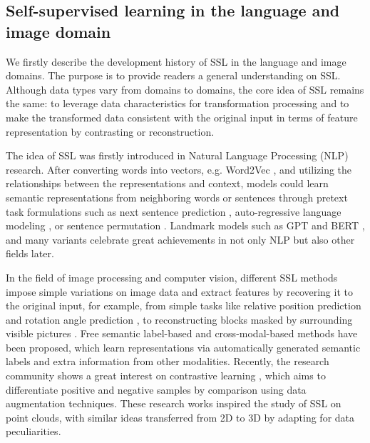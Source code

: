 \documentclass[a4paper,fleqn]{cas-dc}
\begin{document}
\subsection{Self-supervised learning in the language and image domain}
We firstly describe the development history of SSL in the language and image domains. The purpose is to provide readers a general understanding on SSL. Although data types vary from domains to domains, the core idea of SSL remains the same: to leverage data characteristics for transformation processing and to make the transformed data consistent with the original input in terms of feature representation by contrasting or reconstruction.

The idea of SSL was firstly introduced in Natural Language Processing (NLP) research. After converting words into vectors, e.g. Word2Vec \citep{mikolov2013efficient}, and utilizing the relationships between the representations and context, models could learn semantic representations from neighboring words or sentences through pretext task formulations such as next sentence prediction \citep{devlin2018bert}, auto-regressive language modeling \citep{floridi2020gpt}, or sentence permutation \citep{lewis2019bart}. Landmark models such as GPT \citep{floridi2020gpt} and BERT \citep{devlin2018bert}, and many variants celebrate great achievements in not only NLP but also other fields later.

In the field of image processing and computer vision, different SSL methods impose simple variations on image data and extract features by recovering it to the original input, for example, from simple tasks like relative position prediction \citep{doersch2015unsupervised,noroozi2016unsupervised} and rotation angle prediction \citep{SpyrosGidaris2018UnsupervisedRL}, to reconstructing blocks masked by surrounding visible pictures \citep{DeepakPathak2016ContextEF,he2021masked}. Free semantic label-based \citep{faktor2014video,stretcu2015multiple,croitoru2017unsupervised,jiang2018self} and cross-modal-based methods \citep{arandjelovic2017look,agrawal2015learning,jayaraman2015learning} have been proposed, which learn representations via automatically generated semantic labels and extra information from other modalities. Recently, the research community shows a great interest on contrastive learning \citep{chen2020simple,he2020momentum,caron2020unsupervised}, which aims to differentiate positive and negative samples by comparison using data augmentation techniques. These research works inspired the study of SSL on point clouds, with similar ideas transferred from 2D to 3D by adapting for data peculiarities.
\end{document}
